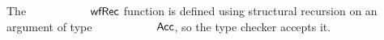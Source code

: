 \begin{code}%
%
\>[2]\AgdaSpace{}%
\AgdaSymbol{:}\AgdaSpace{}%
\AgdaSymbol{(}\AgdaSpace{}%
\AgdaSymbol{:}\AgdaSpace{}%
\AgdaSpace{}%
\AgdaSpace{}%
\AgdaSpace{}%
\AgdaSymbol{)}\<%
\\
\>[2][@{}l@{\AgdaIndent{0}}]%
\>[4]\AgdaSpace{}%
\AgdaSpace{}%
\AgdaSpace{}%
\AgdaSpace{}%
\AgdaSymbol{((}\AgdaSpace{}%
\AgdaSymbol{:}\AgdaSpace{}%
\AgdaSymbol{)}\AgdaSpace{}%
\AgdaSpace{}%
\AgdaSpace{}%
\AgdaOperator{\AgdaBound{<}}\AgdaSpace{}%
\AgdaSpace{}%
\AgdaSpace{}%
\AgdaSpace{}%
\AgdaSymbol{)}\AgdaSpace{}%
\AgdaSpace{}%
\AgdaSpace{}%
\AgdaSymbol{)}\<%
\\
%
\>[4]\AgdaSpace{}%
\AgdaSpace{}%
\AgdaSpace{}%
\AgdaSpace{}%
\AgdaSpace{}%
\<%
\end{code}
The $\AgdaFunction{wfRec}$ function is defined using structural recursion on an argument
of type $\AgdaDatatype{Acc}$, so the type checker accepts it.
